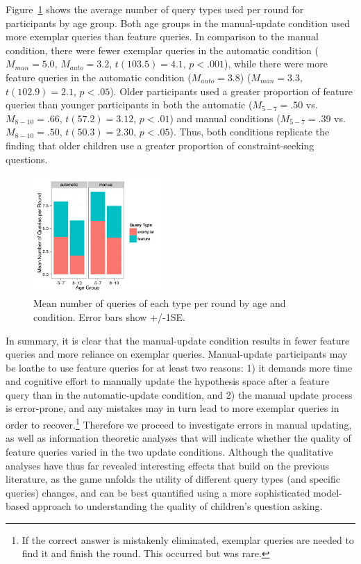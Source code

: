 \documentclass[10pt,letterpaper]{article}
\begin{document}
Figure~\ref{fig:clicks-per-agecond} 
shows the average number of query types used per round for 
participants by age group. Both age groups in the manual-update condition used 
more exemplar queries than feature queries. In comparison to the manual condition, 
there were fewer exemplar queries in the automatic condition ($M_{man} = 5.0$, 
$M_{auto} = 3.2$, $t(103.5)=4.1$, $p<.001$), while there were more feature queries 
in the automatic condition ($M_{auto} = 3.8$) ($M_{man} = 3.3$, $t(102.9)=2.1$, 
$p<.05$). Older participants used a greater proportion of feature queries than younger participants in both the automatic ($M_{5-7}=.50$ vs. $M_{8-10}=.66$, $t(57.2)=3.12$, $p<.01$) and manual conditions ($M_{5-7}=.39$ vs. $M_{8-10}=.50$, $t(50.3)=2.30$, $p<.05$). Thus, both conditions replicate the  finding that older children use a greater proportion of constraint-seeking questions. 

\begin{figure}[h]
  \centering
  \includegraphics[width=0.45\textwidth]{figures/clicks_by_ageGroup_condition_query_type}
  \caption{Mean number of queries of each type per round by age and condition. 
Error bars show +/-1SE.}
  \label{fig:clicks-per-agecond}
\end{figure} 

In summary, it is clear that the manual-update condition results in fewer feature 
queries and more reliance on exemplar queries. 
Manual-update participants may be loathe to use feature queries for at least two reasons: 1) it demands more time and cognitive effort to manually update the hypothesis space after a feature query than 
in the automatic-update condition, and 2) the manual update process is error-prone, 
and any mistakes may in turn lead to more exemplar queries in order to recover.\footnote{If the correct answer is mistakenly eliminated, exemplar queries are needed to find it and finish the round. This occurred but was rare.} Therefore we proceed to investigate errors in manual updating, as well as information theoretic analyses that will indicate whether the quality of feature queries varied in the two update conditions. Although the qualitative analyses have thus far revealed interesting effects that build on the previous literature, as the game unfolds the utility of different query types (and specific queries) changes, and can be best quantified using a more sophisticated model-based approach to
understanding the quality of children's question asking.
\end{document}

